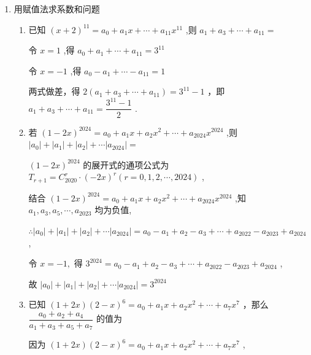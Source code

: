\begin{enumerate}
\begin{enumerate}
    \end{enumerate}
    
    \item 用赋值法求系数和问题
    \begin{enumerate}
        \item 已知 ${\left( x + 2\right) }^{11} = {a}_{0} + {a}_{1}x + \cdots  + {a}_{11}{x}^{11}$ ,则 ${a}_{1} + {a}_{3} + \cdots  + {a}_{11} =$
        \begin{jieda}
            令 $x = 1$ ,得 ${a}_{0} + {a}_{1} + \cdots  + {a}_{11} = {3}^{11}$
            
            令 $x =  - 1$ ,得 ${a}_{0} - {a}_{1} + \cdots  - {a}_{11} = 1$

            两式做差，得 $2\left( {{a}_{1} + {a}_{3} + \cdots  + {a}_{11}}\right)  = {3}^{11} - 1$ ，即 ${a}_{1} + {a}_{3} + \cdots  + {a}_{11} = \dfrac{{3}^{11} - 1}{2}$ .
        \end{jieda}
        
        \item 若 ${\left( 1 - 2x\right) }^{2024} = {a}_{0} + {a}_{1}x + {a}_{2}{x}^{2} + \cdots  + {a}_{2024}{x}^{2024}$ ,则 $\left| {a}_{0}\right|  +  \left| {a}_{1}\right|  + \left| {a}_{2}\right|  + \cdots \left| {a}_{2024}\right|  =$
        \begin{jieda}
            ${\left( 1 - 2x\right) }^{2024}$ 的展开式的通项公式为 ${T}_{r + 1} = {{C}}_{2020}^{r} \cdot  {\left( -2x\right) }^{r}\left( {r = 0,1,2,\cdots ,{2024}}\right)$ ,
            
            结合 ${\left( 1 - 2x\right) }^{2024} = {a}_{0} + {a}_{1}x + {a}_{2}{x}^{2} + \cdots  + {a}_{2024}{x}^{2024}$ ,知 ${a}_{1},{a}_{3},{a}_{5},\cdots ,{a}_{2023}$ 均为负值,
            
            $\therefore \left| {a}_{0}\right|  + \left| {a}_{1}\right|  + \left| {a}_{2}\right|  + \cdots \left| {a}_{2024}\right|  = {a}_{0} - {a}_{1} + {a}_{2} - {a}_{3} + \cdots  + {a}_{2022} - {a}_{2023} + {a}_{2024}$ ,
            
            令 $x =  - 1,$ 得 ${3}^{2024} = {a}_{0} - {a}_{1} + {a}_{2} - {a}_{3} + \cdots  + {a}_{2022} - {a}_{2023} + {a}_{2024}$ ,
            
            故 $\left| {a}_{0}\right|  + \left| {a}_{1}\right|  + \left| {a}_{2}\right|  + \cdots \left| {a}_{2024}\right|  = {3}^{2024}$ 
        \end{jieda}
        
        \item 已知 $\left( {1 + {2x}}\right) {\left( 2 - x\right) }^{6} = {a}_{0} + {a}_{1}x + {a}_{2}{x}^{2} + \cdots  + {a}_{7}{x}^{7}$ ，那么 $\dfrac{{a}_{0} + {a}_{2} + {a}_{4}}{{a}_{1} + {a}_{3} + {a}_{5} + {a}_{7}}$ 的值为
        \begin{jieda}
            因为 $\left( {1 + {2x}}\right) {\left( 2 - x\right) }^{6} = {a}_{0} + {a}_{1}x + {a}_{2}{x}^{2} + \cdots  + {a}_{7}{x}^{7}$ ,
            

\end{jieda}
\end{enumerate}
\end{enumerate}
